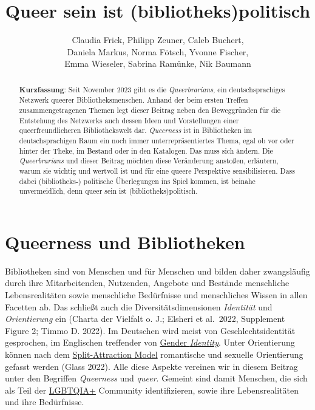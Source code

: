 \documentclass[a4paper,
fontsize=11pt,
oneside,
numbers=noperiodatend,
parskip=half-,
bibliography=totoc,
final
]{scrartcl}
\title{\LARGE{Queer sein ist (bibliotheks)politisch}}%
\author{Claudia Frick, Philipp Zeuner, Caleb Buchert,\\ Daniela Markus, Norma Fötsch, Yvonne Fischer,\\ Emma Wieseler, Sabrina Ramünke, Nik Baumann} %
\date{}
\begin{document}
\maketitle
\thispagestyle{fancyplain} 

\begin{abstract}
\noindent
\textbf{Kurzfassung}: Seit November 2023 gibt es die \textit{Queerbrarians}, ein 
deutschsprachiges Netzwerk queerer Bibliotheksmenschen. Anhand der beim 
ersten Treffen zusammengetragenen Themen legt dieser Beitrag neben den Beweggründen 
für die Entstehung des Netzwerks auch dessen Ideen und Vorstellungen einer 
queerfreundlicheren Bibliothekswelt dar. \textit{Queerness} ist in Bibliotheken im 
deutschsprachigen Raum ein noch immer unterrepräsentiertes Thema, egal ob vor 
oder hinter der Theke, im Bestand oder in den Katalogen. Das muss sich ändern. 
Die \textit{Queerbrarians} und dieser Beitrag möchten diese Veränderung anstoßen, erläutern, 
warum sie wichtig und wertvoll ist und für eine queere Perspektive sensibilisieren. 
Dass dabei (bibliotheks-) politische Überlegungen ins Spiel kommen, ist beinahe 
unvermeidlich, denn queer sein ist (bibliotheks)politisch.
\end{abstract}

\section{Queerness und
Bibliotheken}\label{queerness-und-bibliotheken}

Bibliotheken sind von Menschen und für Menschen und bilden daher
zwangsläufig durch ihre Mitarbeitenden, Nutzenden, Angebote und Bestände
menschliche Lebensrealitäten sowie menschliche Bedürfnisse und
menschliches Wissen in allen Facetten ab. Das schließt auch die
Diversitätsdimensionen \emph{Identität} und \emph{Orientierung} ein
(Charta der Vielfalt o. J.; Elsheri et al.~2022, Supplement Figure 2;
Timmo D. 2022). Im Deutschen wird meist von Geschlechtsidentität
gesprochen, im Englischen treffender von
\href{https://lgbtqia.fandom.com/wiki/Gender_identity}{Gender
\emph{Identity}}. Unter Orientierung können nach dem
\href{https://lgbtqia.mywikis.wiki/wiki/Split_Attraction_Model}{Split-Attraction
Model} romantische und sexuelle Orientierung gefasst werden (Glass
2022). Alle diese Aspekte vereinen wir in diesem Beitrag unter den
Begriffen \emph{Queerness} und \emph{queer}. Gemeint sind damit
Menschen, die sich als Teil der
\href{https://lgbtqia.mywikis.wiki/wiki/LGBT}{LGBTQIA+} Community
identifizieren, sowie ihre Lebensrealitäten und ihre Bedürfnisse.
\end{document}
